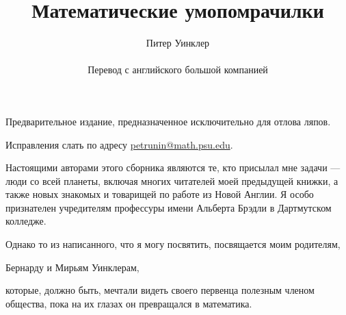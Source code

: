 \documentclass[twoside]{book}
\def\thetitle{Математические умопомрачилки} %
\def\theauthor{Питер Уинклер}
\begin{document}

\title{\thetitle}
\author{\theauthor\\
\\
Перевод с английского большой компанией}
\date{}
\maketitle

\thispagestyle{empty}

Предварительное издание, предназначенное исключительно для отлова ляпов. 

Исправления слать по адресу 
\url{petrunin@math.psu.edu}.

\vfill

\pagebreak

Настоящими авторами этого сборника являются те, кто присылал мне задачи --- люди со всей планеты, включая многих читателей моей предыдущей книжки, а также новых знакомых и товарищей по работе из Новой Англии.
Я особо признателен учредителям профессуры имени Альберта Брэдли в Дартмутском колледже.

Однако то из написанного, что я могу посвятить, посвящается моим родителям,
\begin{center}
Бернарду и Мирьям Уинклерам,
\end{center}
которые, должно быть, мечтали видеть своего первенца полезным членом общества, пока на их глазах он превращался в математика.

\thispagestyle{empty}






















\appendix


{
\small

\printindex

}

{

\sloppy

\printbibliography[heading=bibintoc]


\fussy

}


\newpage

{

\tableofcontents

}
\end{document}

